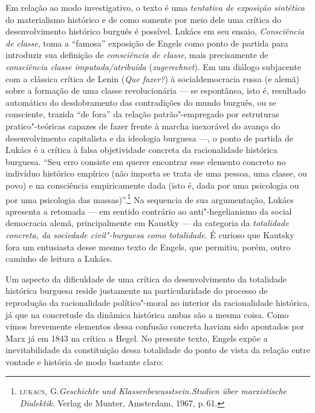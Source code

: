Em relação ao modo investigativo, o texto é uma \emph{tentativa de
exposição sintética} do materialismo histórico e de como somente por
meio dele uma crítica do desenvolvimento histórico burguês é possível.
Lukács em seu ensaio, \emph{Consciência de classe}, toma a ``famosa''
exposição de Engels como ponto de partida para introduzir sua definição
de \emph{consciência de classe}, mais precisamente de \emph{consciência
classe imputada/atribuída} (\emph{zugerechnet}). Em um diálogo
subjacente com a clássica crítica de Lenin (\emph{Que fazer?}) à
socialdemocracia russa (e alemã) sobre a formação de uma classe
revolucionária --- se espontânea, isto é, resultado automático do
desdobramento das contradições do mundo burguês, ou se consciente,
trazida ``de fora'' da relação patrão"-empregado por estruturas
pratico"-teóricas capazes de fazer frente à marcha inexorável do avanço
do desenvolvimento capitalista e da ideologia burguesa ---, o ponto de
partida de Lukács é a crítica à falsa objetividade concreta da
racionalidade histórica burguesa. ``Seu erro consiste em querer
encontrar esse elemento concreto no indivíduo histórico empírico (não
importa se trata de uma pessoa, uma classe, ou povo) e na consciência
empiricamente dada (isto é, dada por uma psicologia ou por uma
psicologia das massas)''.\footnote{\textsc{lukacs}, G.\emph{Geschichte und
  Klassenbewusstsein.Studien über marxistische Dialektik}. Verlag de
  Munter, Amsterdam, 1967, p.\,61.} Na sequencia de sua argumentação,
Lukács apresenta a retomada --- em sentido contrário ao anti"-hegelianismo
da social democracia alemã, principalmente em Kaustky --- da categoria da
\emph{totalidade concreta, da sociedade civil"-burguesa como totalidade}.
É curioso que Kautsky fora um entusiasta desse mesmo texto de Engels,
que permitiu, porém, outro caminho de leitura a Lukács.

Um aspecto da dificuldade de uma crítica do desenvolvimento da
totalidade histórica burguesa reside justamente na particularidade do
processo de reprodução da racionalidade político"-moral no interior da
racionalidade histórica, já que na concretude da dinâmica histórica
ambas são a mesma coisa. Como vimos brevemente elementos dessa confusão
concreta haviam sido apontados por Marx já em 1843 na crítica a Hegel.
No presente texto, Engels expõe a inevitabilidade da constituição dessa
totalidade do ponto de vista da relação entre vontade e história de modo
bastante claro:

